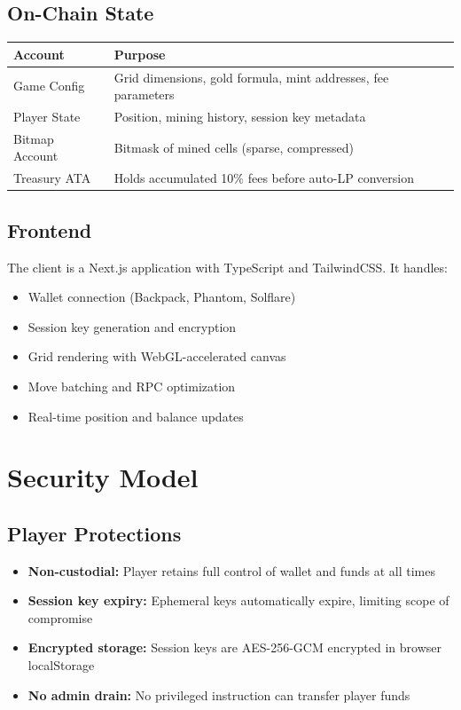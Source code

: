 \documentclass[11pt,a4paper]{article}
\begin{document}
\subsection{On-Chain State}

\begin{table}[h]
\centering
\begin{tabular}{@{}lp{8cm}@{}}
\toprule
Account & Purpose \\
\midrule
Game Config & Grid dimensions, gold formula, mint addresses, fee parameters \\
Player State & Position, mining history, session key metadata \\
Bitmap Account & Bitmask of mined cells (sparse, compressed) \\
Treasury ATA & Holds accumulated 10\% fees before auto-LP conversion \\
\bottomrule
\end{tabular}
\end{table}

\subsection{Frontend}

The client is a Next.js application with TypeScript and TailwindCSS. It handles:

\begin{itemize}[leftmargin=2em]
\item Wallet connection (Backpack, Phantom, Solflare)
\item Session key generation and encryption
\item Grid rendering with WebGL-accelerated canvas
\item Move batching and RPC optimization
\item Real-time position and balance updates
\end{itemize}

\section{Security Model}

\subsection{Player Protections}

\begin{itemize}[leftmargin=2em]
\item \textbf{Non-custodial:} Player retains full control of wallet and funds at all times
\item \textbf{Session key expiry:} Ephemeral keys automatically expire, limiting scope of compromise
\item \textbf{Encrypted storage:} Session keys are AES-256-GCM encrypted in browser localStorage
\item \textbf{No admin drain:} No privileged instruction can transfer player funds
\end{itemize}
\end{document}
